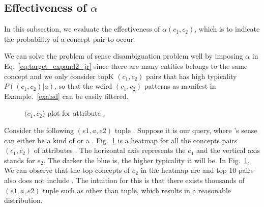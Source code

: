 \begin{table*}[htbp!]
\begin{tabular}{llrrlrr}
    \end{tabular}%
  \label{tab:rerank}%
\end{table*}%




%

\subsection{Effectiveness of $\alpha$}
In this subsection, we evaluate the effectiveness of $\alpha(c_1,c_2)$, which is to indicate the probability of a concept pair to occur.

We can solve the problem of sense disambiguation problem well by imposing $\alpha$ in Eq.~\ref{eq:target_expand2_jr} since there are many entities belongs to the same concept and we only consider topK $(c_1,c_2)$ pairs that has high typicality $P( (c_1,c_2) |a)$, so that the weird $(c_1,c_2)$ patterns as manifest in Example.~\ref{exa:sd} can be easily filtered.

\begin{figure}[!htb]
\centering {}
\caption{$(c_1,c_2$) plot for attribute . } \label{fig:evplot}
\end{figure}

\begin{example}
Consider the following $(e1,a,e2)$ tuple . Suppose it is our query, where 's sense can either be a kind of  or a .
Fig.~\ref{fig:evplot} is a heatmap for all the concepts pairs $(c_1,c_2)$ of attributes . The horizontal axis represents the $e_1$ and the vertical axis stands for $e_2$. The darker the blue is, the higher typicality it will be. In Fig.~\ref{fig:evplot}, We can observe that the top concepts of $e_2$ in the heatmap are  and top 10 pairs also does not include . The intuition for this is that there exists thousands of $(e1,a,e2)$ tuple such as  other than  tuple, which results in a reasonable distribution.
\label{exa:sd}
\end{example}

